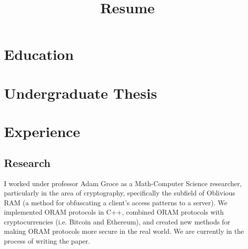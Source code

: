 \documentclass[11pt,a4paper,sans]{moderncv} %
\title{Resume}
\begin{document}
\makecvtitle %


\section{Education}


\section{Undergraduate Thesis}



\section{Experience}

\subsection{Research}

{I worked under professor Adam Groce as a Math-Computer Science researcher, particularly in the area of cryptography, specifically the subfield of Oblivious RAM (a method for obfuscating a client's access patterns to a server). We implemented ORAM protocols in C++, combined ORAM protocols with cryptocurrencies (i.e. Bitcoin and Ethereum), and created new methods for making ORAM protocols more secure in the real world. We are currently in the process of writing the paper.}
\end{document}
